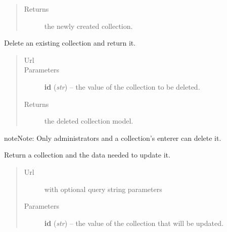 \documentclass[letterpaper,10pt,english]{sphinxmanual}
\begin{document}
\begin{fulllineitems}
\begin{fulllineitems}
\begin{quote}
\begin{description}
\item[{Returns}] \leavevmode
the newly created collection.

\end{description}\end{quote}

\end{fulllineitems}


\begin{fulllineitems}
\label{api:onlinelinguisticdatabase.controllers.oldcollections.OldcollectionsController.delete}
Delete an existing collection and return it.
\begin{quote}\begin{description}
\item[{Url }] \leavevmode
{}

\item[{Parameters}] \leavevmode
\textbf{id} (\emph{str}) -- the  value of the collection to be deleted.

\item[{Returns}] \leavevmode
the deleted collection model.

\end{description}\end{quote}

\begin{notice}{note}{Note:}
Only administrators and a collection's enterer can delete it.
\end{notice}

\end{fulllineitems}


\begin{fulllineitems}
\label{api:onlinelinguisticdatabase.controllers.oldcollections.OldcollectionsController.edit}
Return a collection and the data needed to update it.
\begin{quote}\begin{description}
\item[{Url }] \leavevmode
{} with optional query string parameters

\item[{Parameters}] \leavevmode
\textbf{id} (\emph{str}) -- the  value of the collection that will be updated.


\end{description}
\end{quote}
\end{fulllineitems}
\end{fulllineitems}
\end{document}
